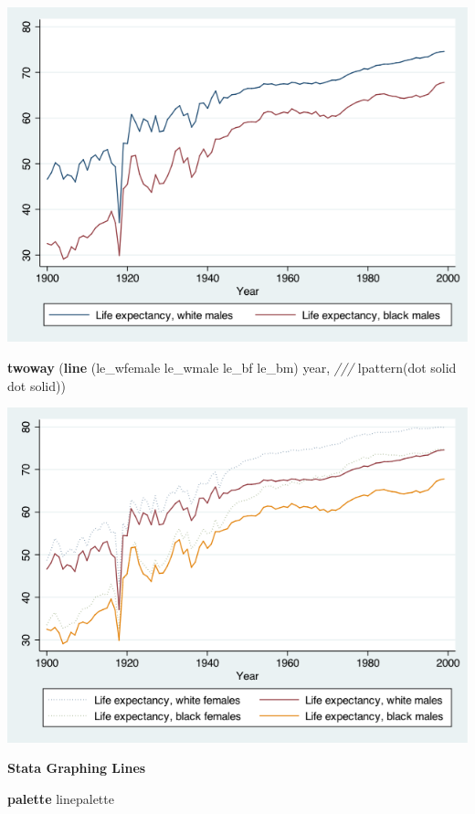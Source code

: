 \documentclass[]{book}
\newenvironment{Shaded}{\begin{snugshade}}{\end{snugshade}}
\newcommand{\BaseNTok}[1]{\textcolor[rgb]{0.00,0.00,0.81}{#1}}
\newcommand{\CommentTok}[1]{\textcolor[rgb]{0.56,0.35,0.01}{\textit{#1}}}
\newcommand{\FunctionTok}[1]{\textcolor[rgb]{0.00,0.00,0.00}{#1}}
\newcommand{\KeywordTok}[1]{\textcolor[rgb]{0.13,0.29,0.53}{\textbf{#1}}}
\newcommand{\NormalTok}[1]{#1}
\begin{document}
\includegraphics{Stata/StataModGraph/images/lineGraph1.png}

\begin{Shaded}
\begin{Highlighting}[]
  \KeywordTok{twoway}\NormalTok{ (}\KeywordTok{line}\NormalTok{ (le_wfemale le_wmale le_bf le_bm) }\FunctionTok{year}\NormalTok{, }\CommentTok{///}
\NormalTok{      lpattern(}\BaseNTok{dot}\NormalTok{ solid }\BaseNTok{dot}\NormalTok{ solid))}
\end{Highlighting}
\end{Shaded}

\includegraphics{Stata/StataModGraph/images/linegraph2.png}

\textbf{Stata Graphing Lines}

\begin{Shaded}
\begin{Highlighting}[]
  \KeywordTok{palette}\NormalTok{ linepalette}
\end{Highlighting}
\end{Shaded}
\end{document}

